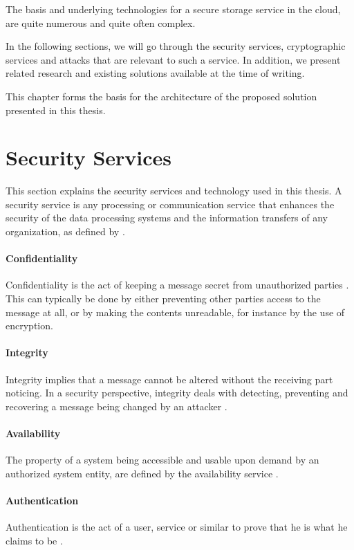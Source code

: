 \documentclass[pdftex,english,10pt,b5paper,twoside]{book}
\begin{document}
The basis and underlying technologies for a secure storage service in the
cloud, are quite numerous and quite often complex.

In the following sections, we will go through the security services, cryptographic
services and attacks that are relevant to such a service. In addition, we present
related research and existing solutions available at the time of writing.

This chapter forms the basis for the architecture of the proposed solution
presented in this thesis.

\section{Security Services}

This section explains the security services and technology used in this thesis. A security
service is any processing or communication service that enhances the security of
the data processing systems and the information transfers of any organization,
as defined by \citet[p. 12]{stallings}.

\paragraph{Confidentiality} Confidentiality is the act of keeping a message
secret from unauthorized parties \cite[p. 18]{stallings}. This can typically be
done by either preventing other parties access to the message at all, or by making
the contents unreadable, for instance by the use of encryption.

\paragraph{Integrity} Integrity implies that a message cannot be altered
without the receiving part noticing. In a security perspective, integrity deals
with detecting, preventing and recovering a message being changed by an
attacker \cite{stallings}.

\paragraph{Availability} The property of a system being accessible and usable
upon demand by an authorized system entity, are defined by the availability
service \cite{stallings}.

\paragraph{Authentication} Authentication is the act of a user, service or
similar to prove that he is what he claims to be \cite{stallings}.
\end{document}
